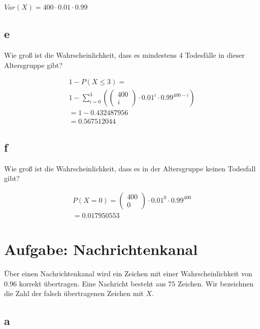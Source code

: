 $Var(X) = 400 \cdot 0.01 \cdot 0.99$

\subsection{e}

Wie groß ist die Wahrscheinlichkeit, dass es mindestens 4 Todesfälle in dieser
Altersgruppe gibt?

\begin{align*}
    1 - P(X \leq 3) =                                                                \\
    1 - \sum_{i = 0}^{3}\left(\begin{pmatrix}
                                  400 \\ i
                              \end{pmatrix} \cdot 0.01^i \cdot 0.99^{400 - i}\right) \\
    = 1 - 0.432487956                                                                \\
    = 0.567512044
\end{align*}

\subsection{f}

Wie groß ist die Wahrscheinlichkeit, dass es in der Altersgruppe keinen
Todesfall gibt?

\begin{align*}
    P(X = 0) = \begin{pmatrix}
                   400 \\ 0
               \end{pmatrix} \cdot 0.01^0 \cdot 0.99^{400} \\
    = 0.017950553
\end{align*}

\section{Aufgabe: Nachrichtenkanal}

Über einen Nachrichtenkanal wird ein Zeichen mit einer Wahrscheinlichkeit von $0.96$ korrekt
übertragen. Eine Nachricht besteht aus $75$ Zeichen. Wir bezeichnen die Zahl der falsch
übertragenen Zeichen mit $X$.

\subsection{a}


